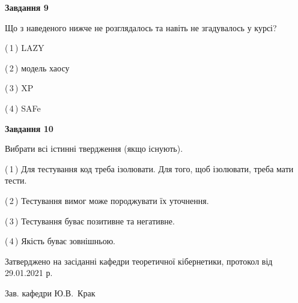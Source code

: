 \documentclass[10pt, ukrainian]{article}
\begin{document}
{\begin {large}
{\begin {center}\textbf{Завдання 9}\end {center}}\par
Що з наведеного нижче не розглядалось та навіть не згадувалось у курсі?\par
\vspace{2mm}



(\,1\,) LAZY%



(\,2\,) модель хаосу%



(\,3\,) XP%



(\,4\,) SAFe%


{\begin {center}\textbf{Завдання 10}\end {center}}\par
Вибрати всі істинні твердження (якщо існують).\par
\vspace{2mm}



(\,1\,) Для тестування код треба ізолювати. Для того, щоб ізолювати, треба мати тести.%



(\,2\,) Тестування вимог може породжувати їх уточнення.%



(\,3\,) Тестування буває позитивне та негативне.%



(\,4\,) Якість буває зовнішньою.%



\end {large}}
{\vspace{5mm}\smallskip \begin {small} Затверджено на засіданні кафедри теоретичної кібернетики, протокол  від   29.01.2021 р.\par\smallskip\smallskip
{\parbox {6.5 cm}{Зав. кафедри \dotfill Ю.В.~Крак}} \end{small}}
\newpage
\end{document}
